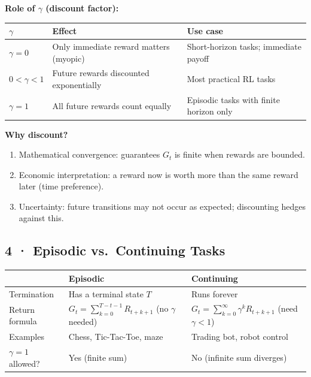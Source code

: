 \documentclass[11pt,a4paper]{article}
\begin{document}
\textbf{Role of $\gamma$ (discount factor):}
\begin{center}
\begin{tabular}{p{2.5cm}p{5.5cm}p{5.5cm}}
\toprule
$\gamma$ & Effect & Use case \\
\midrule
$\gamma = 0$ & Only immediate reward matters (myopic) & Short-horizon tasks; immediate payoff \\
$0 < \gamma < 1$ & Future rewards discounted exponentially & Most practical RL tasks \\
$\gamma = 1$ & All future rewards count equally & Episodic tasks with finite horizon only \\
\bottomrule
\end{tabular}
\end{center}

\textbf{Why discount?}
\begin{enumerate}
  \item Mathematical convergence: guarantees $G_t$ is finite when rewards are bounded.
  \item Economic interpretation: a reward now is worth more than the same reward later (time preference).
  \item Uncertainty: future transitions may not occur as expected; discounting hedges against this.
\end{enumerate}

\subsection*{4 · Episodic vs.\ Continuing Tasks}

\begin{tcolorbox}[defn={Two Task Types}]
\begin{tabular}{p{3.5cm}p{5.5cm}p{5cm}}
\toprule
& \textbf{Episodic} & \textbf{Continuing} \\
\midrule
Termination & Has a terminal state $T$ & Runs forever \\
Return formula & $G_t = \displaystyle\sum_{k=0}^{T-t-1} R_{t+k+1}$ (no $\gamma$ needed) & $G_t = \displaystyle\sum_{k=0}^{\infty} \gamma^k R_{t+k+1}$ (need $\gamma<1$) \\
Examples & Chess, Tic-Tac-Toe, maze & Trading bot, robot control \\
$\gamma = 1$ allowed? & Yes (finite sum) & No (infinite sum diverges) \\
\bottomrule
\end{tabular}
\end{tcolorbox}
\end{document}
